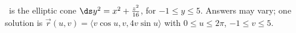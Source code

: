 {\surfaceS\ is the elliptic cone $\ds y^2= x^2+\frac{z^2}{16}$, for $-1 \leq y \leq 5$.
}
{Answers may vary; one solution is $\vec r(u,v) = \langle v\cos u, v, 4v\sin u\rangle$ with $0\leq u\leq 2\pi$, $-1\leq v\leq 5$.
}
